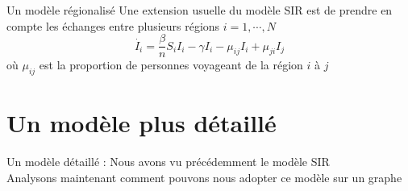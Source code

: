 \documentclass[10pt]{beamer}
\begin{document}
\begin{frame}{Un modèle régionalisé}
  Une extension usuelle du modèle SIR est de prendre en compte les échanges
  entre plusieurs régions $i = 1, \cdots, N$
  \begin{equation}
    \dot{I_i} = \frac{\beta}{n} S_i I_i - \gamma I_i - \mu_{ij} I_i +
    \mu_{ji} I_j
  \end{equation}
  où $\mu_{ij}$ est la proportion de personnes voyageant de la région $i$ à $j$
\end{frame}

\section{Un modèle plus détaillé}

\begin{frame}{Un modèle détaillé : }
  Nous avons vu précédemment le modèle SIR \\
  Analysons maintenant comment pouvons nous adopter ce modèle sur un graphe

\end{frame}
\end{document}
